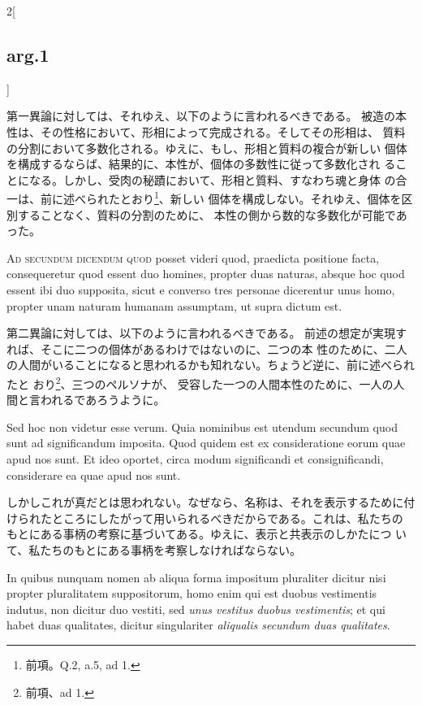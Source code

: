 \documentclass[paper=a4paper,fontsize=10pt,jafontsize=9pt,titlepage]{jlreq}
\begin{document}
\begin{paracol}{2}[\subsection{arg.1}]
\switchcolumn

第一異論に対しては、それゆえ、以下のように言われるべきである。
被造の本性は、その性格において、形相によって完成される。そしてその形相は、
 質料の分割において多数化される。ゆえに、もし、形相と質料の複合が新しい
 個体を構成するならば、結果的に、本性が、個体の多数性に従って多数化され
 ることになる。しかし、受肉の秘蹟において、形相と質料、すなわち魂と身体
 の合一は、前に述べられたとおり\footnote{前項。Q.2, a.5, ad 1.}、新しい
 個体を構成しない。それゆえ、個体を区別することなく、質料の分割のために、
 本性の側から数的な多数化が可能であった。

\switchcolumn*[\subsection{ad.2}]

{\scshape Ad secundum dicendum quod} posset videri quod, praedicta positione facta,
consequeretur quod essent duo homines, propter duas naturas, absque hoc
quod essent ibi duo supposita, sicut e converso tres personae dicerentur
unus homo, propter unam naturam humanam assumptam, ut supra dictum
est.

\switchcolumn

第二異論に対しては、以下のように言われるべきである。
前述の想定が実現すれば、そこに二つの個体があるわけではないのに、二つの本
 性のために、二人の人間がいることになると思われるかも知れない。ちょうど逆に、前に述べられたと
 おり\footnote{前項、ad 1.}、三つのペルソナが、
 受容した一つの人間本性のために、一人の人間と言われるであろうように。

\switchcolumn*

Sed hoc non videtur esse verum. Quia nominibus est utendum secundum
quod sunt ad significandum imposita. Quod quidem est ex consideratione
eorum quae apud nos sunt. Et ideo oportet, circa modum significandi et
consignificandi, considerare ea quae apud nos sunt.

\switchcolumn

しかしこれが真だとは思われない。なぜなら、名称は、それを表示するために付
 けられたところにしたがって用いられるべきだからである。これは、私たちの
 もとにある事柄の考察に基づいてある。ゆえに、表示と共表示のしかたにつ
 いて、私たちのもとにある事柄を考察しなければならない。

\switchcolumn*

In quibus nunquam
nomen ab aliqua forma impositum pluraliter dicitur nisi propter
pluralitatem suppositorum, homo enim qui est duobus vestimentis indutus,
non dicitur duo vestiti, sed {\itshape unus vestitus duobus vestimentis}; et qui
habet duas qualitates, dicitur singulariter {\itshape aliqualis secundum duas
qualitates}.


\end{paracol}
\end{document}

